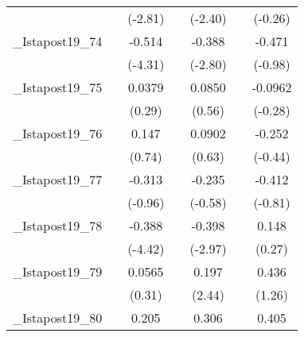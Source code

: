 {\begin{tabular}{l*{6}{c}}
            &                     &     (-2.81)         &                     &     (-2.40)         &                     &     (-0.26)         \\
[1em]
\_Istapost19\_74&                     &      -0.514\sym{***}&                     &      -0.388\sym{**} &                     &      -0.471         \\
            &                     &     (-4.31)         &                     &     (-2.80)         &                     &     (-0.98)         \\
[1em]
\_Istapost19\_75&                     &      0.0379         &                     &      0.0850         &                     &     -0.0962         \\
            &                     &      (0.29)         &                     &      (0.56)         &                     &     (-0.28)         \\
[1em]
\_Istapost19\_76&                     &       0.147         &                     &      0.0902         &                     &      -0.252         \\
            &                     &      (0.74)         &                     &      (0.63)         &                     &     (-0.44)         \\
[1em]
\_Istapost19\_77&                     &      -0.313         &                     &      -0.235         &                     &      -0.412         \\
            &                     &     (-0.96)         &                     &     (-0.58)         &                     &     (-0.81)         \\
[1em]
\_Istapost19\_78&                     &      -0.388\sym{***}&                     &      -0.398\sym{**} &                     &       0.148         \\
            &                     &     (-4.42)         &                     &     (-2.97)         &                     &      (0.27)         \\
[1em]
\_Istapost19\_79&                     &      0.0565         &                     &       0.197\sym{*}  &                     &       0.436         \\
            &                     &      (0.31)         &                     &      (2.44)         &                     &      (1.26)         \\
[1em]
\_Istapost19\_80&                     &       0.205         &                     &       0.306         &                     &       0.405         \\

\end{tabular}}
